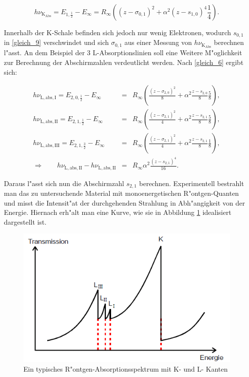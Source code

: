 		\begin{equation}
			h\nu_{\mathrm{K}_\mathrm{Abs}} = E_{1,\frac{1}{2}} - E_\infty = R_\infty \left( (z - \sigma_{0,1})^2 + \alpha^2 (z-s_{1,0})^4 \frac{1}{4} \right). \label{gleich_11}
		\end{equation}

		Innerhalb der K-Schale befinden sich jedoch nur wenig Elektronen, wodurch $s_{0,1}$ in \ref{gleich_9} verschwindet und sich $\sigma_{0,1}$ aus einer Messung von $h\nu_{\mathrm{K}_\mathrm{Abs}}$ berechnen l"asst.
		An dem Beispiel der 3 L-Absorptionslinien soll eine Weitere M"oglichkeit zur Berechnung der Abschirmzahlen verdeutlicht werden.
		Nach \ref{gleich_6} ergibt sich:

		\begin{eqnarray*}
			h \nu_\mathrm{L,abs,I} = E_{2,0,\frac{1}{2}} - E_\infty &=& R_\infty \left( \frac{(z-\sigma_{2,0})^2}{8} + \alpha^2 \frac{z - s_{2,0}}{8} \frac{5}{8} \right),\\
			h \nu_\mathrm{L,abs,II} = E_{2,1,\frac{1}{2}} - E_\infty &=& R_\infty \left( \frac{(z-\sigma_{2,1})^2}{4} + \alpha^2 \frac{z - s_{2,1}}{8} \frac{5}{8} \right),\\
			h \nu_\mathrm{L,abs,III} = E_{2,1,\frac{3}{2}} - E_\infty &=& R_\infty \left( \frac{(z-\sigma_{2,1})^2}{4} + \alpha^2 \frac{z - s_{2,1}}{8} \frac{1}{8} \right),\\
			\Rightarrow \qquad h\nu_\mathrm{L,abs,II} - h\nu_\mathrm{L,abs,II} &=& R_\infty \alpha^2 \frac{(z - s_{2,1})^4}{16}.
		\end{eqnarray*}

		Daraus l"asst sich nun die Abschirmzahl $s_{2,1}$ berechnen.
		Experimentell bestrahlt man das zu untersuchende Material mit monoenergetischen R"ontgen-Quanten und misst die Intensit"at der durchgehenden Strahlung in Abh"angigkeit von der Energie.
		Hiernach erh"alt man eine Kurve, wie sie in Abbildung \ref{Absorption} idealisiert dargestellt ist.

		\begin{figure}[htbp]
			\centering
			\includegraphics[width = 12cm]{img/absorption.png}
			\caption{Ein typisches R"ontgen-Absorptionsspektrum mit K- und L- Kanten}
			\label{Absorption}
		\end{figure}

